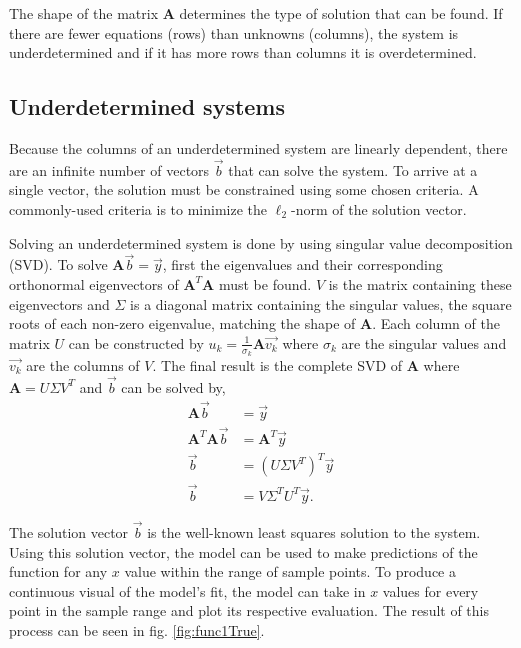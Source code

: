 The shape of the matrix $\mathbf{A}$ determines the type of solution that can be found.  If there are fewer equations (rows) than unknowns (columns), the system is underdetermined and if it has more rows than columns it is overdetermined.  


\subsection{Underdetermined systems}
Because the columns of an underdetermined system are linearly dependent, there are an infinite number of vectors $\vec{b}$ that can solve the system.  To arrive at a single vector, the solution must be constrained using some chosen criteria.  A commonly-used criteria is to minimize the $\ell_2$-norm of the solution vector. 

\par Solving an underdetermined system is done by using singular value decomposition (SVD). To solve $\mathbf{A}\vec{b}=\vec{y}$, first the eigenvalues and their corresponding orthonormal eigenvectors of $\mathbf{A}^T\mathbf{A}$ must be found. $V$ is the matrix containing these eigenvectors and $\Sigma$ is a diagonal matrix containing the singular values, the square roots of each non-zero eigenvalue, matching the shape of $\mathbf{A}$. Each column of the matrix $U$ can be constructed by $u_k=\frac{1}{\sigma_k}\mathbf{A}\vec{v_k}$ where $\sigma_k$ are the singular values and $\vec{v_k}$ are the columns of $V$. The final result is the complete SVD of $\mathbf{A}$ where $\mathbf{A}=U\Sigma V^T$ and $\vec{b}$ can be solved by,
\begin{align}
\mathbf{A}\vec{b} &= \vec{y} \label{eq:Aby} \\
\mathbf{A}^T\mathbf{A}\vec{b} &= \mathbf{A}^T\vec{y} \nonumber \\
\vec{b} &= (U\Sigma V^T)^T\vec{y} \nonumber \\
\vec{b} &= V\Sigma^TU^T\vec{y}.
\end{align}

\par The solution vector $\vec{b}$ is the well-known least squares solution to the system. Using this solution vector, the model can be used to make predictions of the function for any $x$ value within the range of sample points. To produce a continuous visual of the model's fit, the model can take in $x$ values for every point in the sample range and plot its respective evaluation. The result of this process can be seen in fig. \ref{fig:func1True}.

